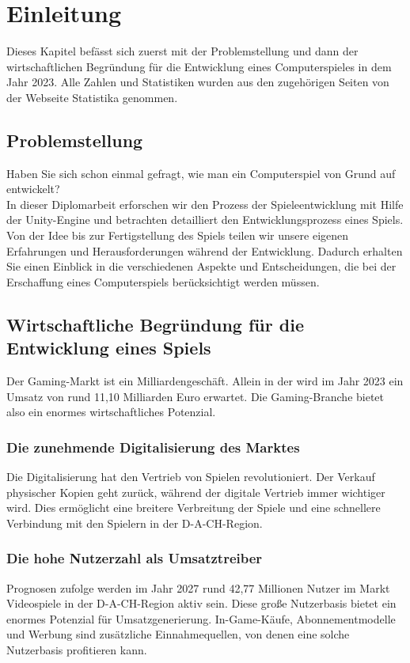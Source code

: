 \chapter{Einleitung}

Dieses Kapitel befässt sich zuerst mit der Problemstellung und dann der wirtschaftlichen Begründung für die Entwicklung eines Computerspieles in dem Jahr 2023. Alle Zahlen und Statistiken wurden aus den zugehörigen Seiten von der Webseite Statistika\cite{statistika} genommen.

\section{Problemstellung}
Haben Sie sich schon einmal gefragt, wie man ein Computerspiel von Grund auf entwickelt?
\\ In dieser Diplomarbeit erforschen wir den Prozess der Spieleentwicklung mit Hilfe der Unity-Engine und betrachten detailliert den Entwicklungsprozess eines Spiels. Von der Idee bis zur Fertigstellung des Spiels teilen wir unsere eigenen Erfahrungen und Herausforderungen während der Entwicklung. Dadurch erhalten Sie einen Einblick in die verschiedenen Aspekte und Entscheidungen, die bei der Erschaffung eines Computerspiels berücksichtigt werden müssen.

\pagebreak

\section{Wirtschaftliche Begründung für die Entwicklung eines Spiels}
Der Gaming-Markt ist ein Milliardengeschäft. Allein in der  wird im Jahr 2023 ein Umsatz von rund 11,10 Milliarden Euro erwartet. Die Gaming-Branche bietet also ein enormes wirtschaftliches Potenzial.

\subsection{Die zunehmende Digitalisierung des Marktes}
Die Digitalisierung hat den Vertrieb von Spielen revolutioniert. Der Verkauf physischer Kopien geht zurück, während der digitale Vertrieb immer wichtiger wird. Dies ermöglicht eine breitere Verbreitung der Spiele und eine schnellere Verbindung mit den Spielern in der D-A-CH-Region.

\subsection{Die hohe Nutzerzahl als Umsatztreiber}
Prognosen zufolge werden im Jahr 2027 rund 42,77 Millionen Nutzer im Markt Videospiele in der D-A-CH-Region aktiv sein. Diese große Nutzerbasis bietet ein enormes Potenzial für Umsatzgenerierung. In-Game-Käufe, Abonnementmodelle und Werbung sind zusätzliche Einnahmequellen, von denen eine solche Nutzerbasis profitieren kann.

